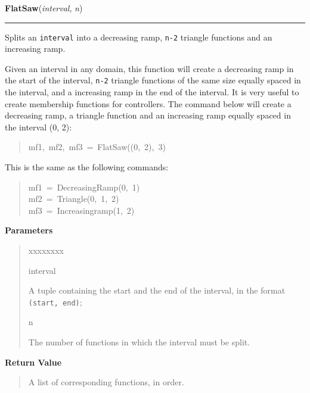     \label{peach:fuzzy:mf:FlatSaw}

    \vspace{0.5ex}

\hspace{.8\funcindent}\begin{boxedminipage}{\funcwidth}

    \raggedright \textbf{FlatSaw}(\textit{interval}, \textit{n})

    \vspace{-1.5ex}

    \rule{\textwidth}{0.5\fboxrule}
\setlength{\parskip}{2ex}

Splits an \texttt{interval} into a decreasing ramp, \texttt{n-2} triangle functions
and an increasing ramp.

Given an interval in any domain, this function will create a decreasing ramp
in the start of the interval, \texttt{n-2} triangle functions of the same size
equally spaced in the interval, and a increasing ramp in the end of the
interval. It is very useful to create membership functions for controllers.
The command below will create a decreasing ramp, a triangle function and an
increasing ramp equally spaced in the interval (0, 2):
%
\begin{quote}{\ttfamily \raggedright \noindent
mf1,~mf2,~mf3~=~FlatSaw((0,~2),~3)
}
\end{quote}

This is the same as the following commands:
%
\begin{quote}{\ttfamily \raggedright \noindent
mf1~=~DecreasingRamp(0,~1)\\
mf2~=~Triangle(0,~1,~2)\\
mf3~=~Increasingramp(1,~2)
}
\end{quote}
\setlength{\parskip}{1ex}
      \textbf{Parameters}
      \vspace{-1ex}

      \begin{quote}
        \begin{Ventry}{xxxxxxxx}

          \item[interval]


A tuple containing the start and the end of the interval, in the format
\texttt{(start, end)};
          \item[n]


The number of functions in which the interval must be split.
        \end{Ventry}

      \end{quote}

      \textbf{Return Value}
    \vspace{-1ex}

      \begin{quote}

A list of corresponding functions, in order.
      \end{quote}

    \end{boxedminipage}



